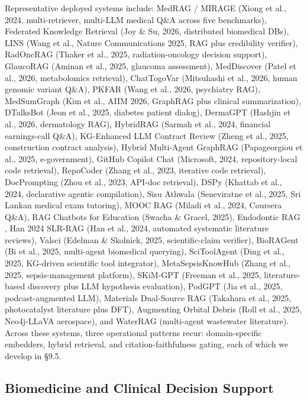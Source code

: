 \documentclass{article}
\begin{document}
Representative deployed systems include: MedRAG / MIRAGE (Xiong et al., 2024, multi-retriever, multi-LLM medical Q\&A across five benchmarks), Federated Knowledge Retrieval (Joy \& Su, 2026, distributed biomedical DBs), LINS (Wang et al., Nature Communications 2025, RAG plus credibility verifier), RadOncRAG (Thaker et al., 2025, radiation-oncology decision support), GlaucoRAG (Aminan et al., 2025, glaucoma assessment), MedDiscover (Patel et al., 2026, metabolomics retrieval), ChatTogoVar (Mitsuhashi et al., 2026, human genomic variant Q\&A), PKFAR (Wang et al., 2026, psychiatry RAG), MedSumGraph (Kim et al., AIIM 2026, GraphRAG plus clinical summarization), DTalksBot (Jeon et al., 2025, diabetes patient dialog), DermaGPT (Hashjin et al., 2026, dermatology RAG), HybridRAG (Sarmah et al., 2024, financial earnings-call Q\&A), KG-Enhanced LLM Contract Review (Zheng et al., 2025, construction contract analysis), Hybrid Multi-Agent GraphRAG (Papageorgiou et al., 2025, e-government), GitHub Copilot Chat (Microsoft, 2024, repository-local code retrieval), RepoCoder (Zhang et al., 2023, iterative code retrieval), DocPrompting (Zhou et al., 2023, API-doc retrieval), DSPy (Khattab et al., 2024, declarative agentic compilation), Sisu Athwala (Seneviratne et al., 2025, Sri Lankan medical exam tutoring), MOOC RAG (Miladi et al., 2024, Coursera Q\&A), RAG Chatbots for Education (Swacha \& Gracel, 2025), Endodontic RAG \citep{xu2024searchinthechainto}, Han 2024 SLR-RAG (Han et al., 2024, automated systematic literature reviews), Valsci (Edelman \& Skolnick, 2025, scientific-claim verifier), BioRAGent (Bi et al., 2025, multi-agent biomedical querying), SciToolAgent (Ding et al., 2025, KG-driven scientific tool integrator), MetaSepsisKnowHub (Zhang et al., 2025, sepsis-management platform), SKiM-GPT (Freeman et al., 2025, literature-based discovery plus LLM hypothesis evaluation), PodGPT (Jia et al., 2025, podcast-augmented LLM), Materials Dual-Source RAG (Takahara et al., 2025, photocatalyst literature plus DFT), Augmenting Orbital Debris (Roll et al., 2025, Neo4j-LLaVA aerospace), and WaterRAG (multi-agent wastewater literature). Across these systems, three operational patterns recur: domain-specific embedders, hybrid retrieval, and citation-faithfulness gating, each of which we develop in §9.5.

\subsection{Biomedicine and Clinical Decision Support}\label{biomedicine-and-clinical-decision-support}
\end{document}
